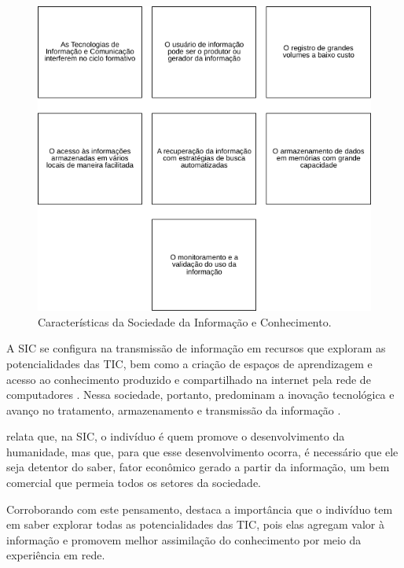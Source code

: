 \documentclass[portuguese]{textolivre}
\begin{document}
\begin{figure}[htbp]
\centering
\begin{minipage}{.75\textwidth} 
  \includegraphics[width=\textwidth]{figura03.pdf}
  \caption{Características da Sociedade da Informação e Conhecimento.}
  \label{fig03}
\end{minipage}
\end{figure}


A SIC se configura na transmissão de informação em recursos que exploram
as potencialidades das TIC, bem como a criação de espaços de
aprendizagem e acesso ao conhecimento produzido e compartilhado na
internet pela rede de computadores \cite{castells2002,castells2016}. Nessa
sociedade, portanto, predominam a inovação tecnológica e avanço no
tratamento, armazenamento e transmissão da informação
\cite{webster2006, kenski2012}.

\textcite{takahashi2000} relata que, na SIC, o indivíduo é quem promove o
desenvolvimento da humanidade, mas que, para que esse desenvolvimento
ocorra, é necessário que ele seja detentor do saber, fator econômico
gerado a partir da informação, um bem comercial que permeia todos os
setores da sociedade.

Corroborando com este pensamento, \textcite{hargreaves2003} destaca a
importância que o indivíduo tem em saber explorar todas as
potencialidades das TIC, pois elas agregam valor à informação e promovem
melhor assimilação do conhecimento por meio da experiência em rede.
\end{document}
